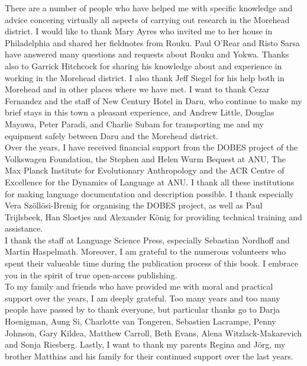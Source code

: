 There are a number of people who have helped me with specific knowledge and advice concering virtually all aspects of carrying out research in the Morehead district. I would like to thank Mary Ayres who invited me to her house in Philadelphia and shared her fieldnotes from Rouku. Paul O'Rear and Risto Sarsa have answered many questions and requests about Rouku and Yokwa. Thanks also to Garrick Hitchcock for sharing his knowledge about and experience in working in the Morehead district. I also thank Jeff Siegel for his help both in Morehead and in other places where we have met. I want to thank Cezar Fernandez and the staff of New Century Hotel in Daru, who continue to make my brief stays in this town a pleasant experience, and Andrew Little, Douglas Mayawa, Peter Paradi, and Charlie Subam for transporting me and my equipment safely between Daru and the Morehead district.\\

Over the years, I have received financial support from the DOBES project of the Volkswagen Foundation, the Stephen and Helen Wurm Bequest at ANU, The Max Planck Institute for Evolutionary Anthropology and the ACR Centre of Excellence for the Dynamics of Language at ANU. I thank all these institutions for making language documentation and description possible. I thank especially Vera Szöllösi-Brenig for organising the DOBES project, as well as Paul Trijlsbeek, Han Sloetjes and Alexander König for providing technical training and assistance.\\

I thank the staff at Language Science Press, especially Sebastian Nordhoff and Martin Haspelmath. Moreover, I am grateful to the numerous volunteers who spent their valueable time during the publication process of this book. I embrace you in the spirit of true open-access publishing.\\

To my family and friends who have provided me with moral and practical support over the years, I am deeply grateful. Too many years and too many people have passed by to thank everyone, but particular thanks go to Darja Hoenigman, Aung Si, Charlotte van Tongeren, Sebastien Lacrampe, Penny Johnson, Gary Kildea, Matthew Carroll, Beth Evans, Alena Witzlack-Makarevich and Sonja Riesberg. Lastly, I want to thank my parents Regina and Jörg, my brother Matthias and his family for their continued support over the last years.